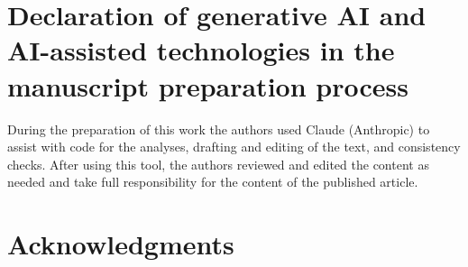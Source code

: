 \section*{Declaration of generative AI and AI-assisted technologies in the manuscript preparation process}
During the preparation of this work the authors used Claude (Anthropic) to assist with code for the analyses, drafting and editing of the text, and consistency checks. After using this tool, the authors reviewed and edited the content as needed and take full responsibility for the content of the published article.

\section*{Acknowledgments}

